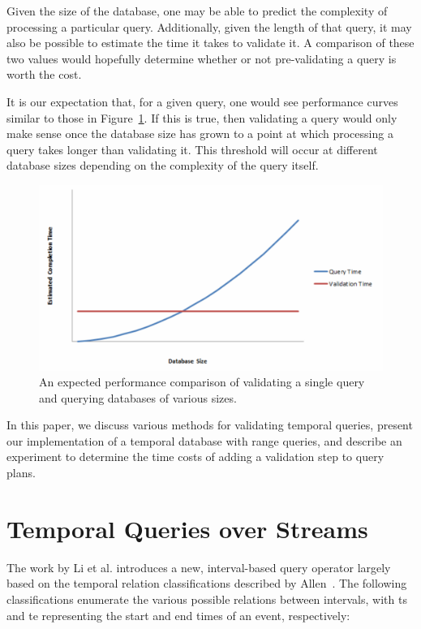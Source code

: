 \documentclass{achemso}
\begin{document}
Given the size of the database, one may be able to predict the complexity of processing a particular query. Additionally, given the length of that query, it may also be possible to estimate the time it takes to validate it. A comparison of these two values would hopefully determine whether or not pre-validating a query is worth the cost.

It is our expectation that, for a given query, one would see performance curves similar to those in Figure~\ref{figure:expectation}.  If this is true, then validating a query would only make sense once the database size has grown to a point at which processing a query takes longer than validating it.  This threshold will occur at different database sizes depending on the complexity of the query itself.

\begin{figure}[h!]
  \centering
	\includegraphics[scale=0.25]{expectation.png}
     \caption{An expected performance comparison of validating a single query and querying databases of various sizes.}
    \label{figure:expectation}
\end{figure}

In this paper, we discuss various methods for validating temporal queries, present our implementation of a temporal database with range queries, and describe an experiment to determine the time costs of adding a validation step to query plans.

\section{Temporal Queries over Streams}
The work by Li et al. introduces a new, interval-based query operator largely based on the temporal relation classifications described by Allen~\cite{Allen:1983}. The following classifications enumerate the various possible relations between intervals, with ts and te representing the start and end times of an event, respectively:
\end{document}
